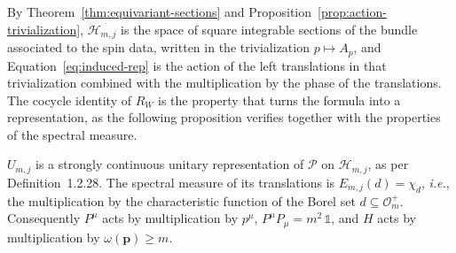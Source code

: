 By Theorem~\ref{thm:equivariant-sections} and Proposition~\ref{prop:action-trivialization}, $\mathcal{H}_{m,j}$ is the space of square integrable sections of the bundle associated to the spin data, written in the trivialization $p\mapsto A_p$, and Equation~\eqref{eq:induced-rep} is the action of the left translations in that trivialization combined with the multiplication by the phase of the translations. The cocycle identity of $R_W$ is the property that turns the formula into a representation, as the following proposition verifies together with the properties of the spectral measure.

\begin{proposition}\label{prop:induced-unitary}
	$U_{m,j}$ is a strongly continuous unitary representation of $\mathcal{P}$ on $\mathcal{H}_{m,j}$, as per Definition~1.2.28. The spectral measure of its translations is $E_{m,j}(d)=\chi_d$, \textit{i.e.}, the multiplication by the characteristic function of the Borel set $d\subseteq\mathcal{O}_m^+$. Consequently $P^\mu$ acts by multiplication by $p^\mu$, $P^\mu P_\mu=m^2\,\mathbb{1}$, and $H$ acts by multiplication by $\omega(\mathbf{p})\geq m$.
\end{proposition}

